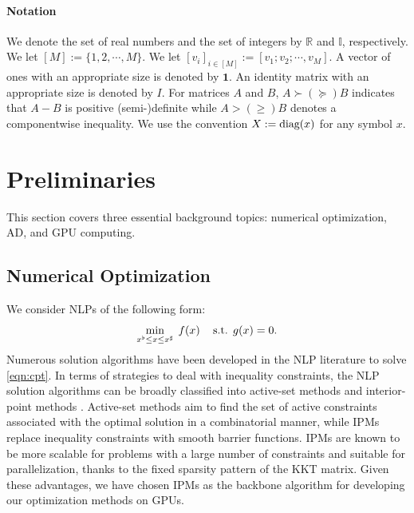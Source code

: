 \documentclass{IEEEtran4PSCC} %
\newcommand{\st}{\mathop{\text{\normalfont s.t.}}}
\newcommand{\diag}{\mathop{\text{\normalfont diag}}}
\begin{document}

\paragraph*{Notation}
We denote the set of real numbers and the set of integers by
$\mathbb{R}$ and $\mathbb{I}$, respectively. We let $[M]:=\{1,2,\cdots,M\}$. We let
$[v_i]_{i\in[M]}:=[v_1;v_2;\cdots,v_M]$.  A vector of ones with an
appropriate size is denoted by $\boldsymbol{1}$. An identity matrix
with an appropriate size is denoted by $I$. For matrices $A$ and $B$,
$A\succ(\succeq) B$ indicates that $A-B$ is positive (semi-)definite
while $A>(\geq) B$ denotes a componentwise inequality. We use the
convention $X:=\diag(x)$ for any symbol $x$.

\section{Preliminaries}\label{sec:prelim}
This section covers three essential background topics: numerical
optimization, AD, and GPU computing.

\subsection{Numerical Optimization}\label{sec:numopt}
We consider NLPs of the following form:
\begin{equation}\label{eqn:cpt}
    \min_{x^\flat \leq x \leq x^\sharp}\;  f(x) \quad \st\;
     g(x) =0 .
\end{equation}
Numerous solution algorithms have been developed in the NLP
literature to solve \eqref{eqn:cpt}. In terms of strategies to deal with inequality
constraints, the NLP solution algorithms can be broadly classified
into active-set methods and interior-point methods \cite{nocedal2006numerical}.
Active-set methods aim to find the set of active constraints associated
with the optimal solution in a combinatorial manner, while IPMs
replace inequality constraints with smooth barrier functions.
IPMs are known to be
more scalable for problems with a large number of constraints and
suitable for parallelization, thanks to the fixed sparsity pattern of
the KKT matrix. Given these advantages, we have chosen IPMs as the
backbone algorithm for developing our optimization methods on GPUs.
\end{document}
